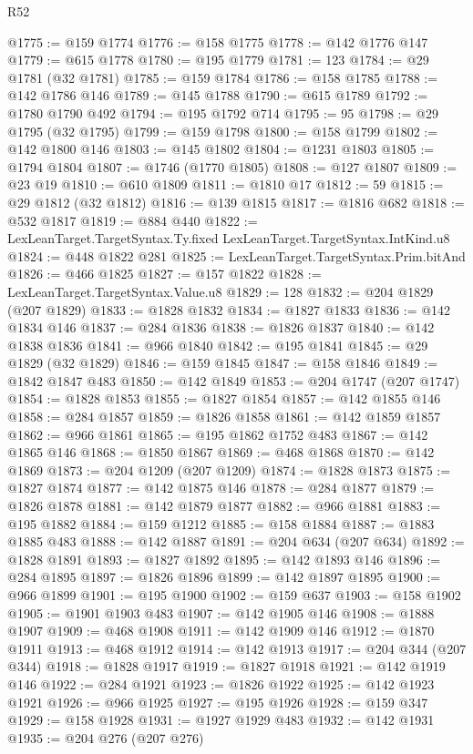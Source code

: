 \begin{lexlean}{R52}
\begin{coremodule}
{{{{{{{{{{{{{{{{{{{{{{{{{{{{{{{{{{{{{{{{{{{{{{{{{{{{{{{{{{{{{{{{{{{{{{{{{{{{{{{{{{{{{{{{{{{{{{{{{{{{{{{{{{{{{{{{{{{{{{{{{{{{{{{{{{{{{{{{{{{{{{{{{{{{{{{{{{{{{{{{{{{{{{{{{{{{{{{{{{{{{{{{{{{{{{{{{{{{{{@1775 := @159 @1774
@1776 := @158 @1775
@1778 := @142 @1776 @147
@1779 := @615 @1778
@1780 := @195 @1779
@1781 := 123
@1784 := @29 @1781 (@32 @1781)
@1785 := @159 @1784
@1786 := @158 @1785
@1788 := @142 @1786 @146
@1789 := @145 @1788
@1790 := @615 @1789
@1792 := @1780 @1790 @492
@1794 := @195 @1792 @714
@1795 := 95
@1798 := @29 @1795 (@32 @1795)
@1799 := @159 @1798
@1800 := @158 @1799
@1802 := @142 @1800 @146
@1803 := @145 @1802
@1804 := @1231 @1803
@1805 := @1794 @1804
@1807 := @1746 (@1770 @1805)
@1808 := @127 @1807
@1809 := @23 @19
@1810 := @610 @1809
@1811 := @1810 @17
@1812 := 59
@1815 := @29 @1812 (@32 @1812)
@1816 := @139 @1815
@1817 := @1816 @682
@1818 := @532 @1817
@1819 := @884 @440
@1822 := LexLeanTarget.TargetSyntax.Ty.fixed LexLeanTarget.TargetSyntax.IntKind.u8
@1824 := @448 @1822 @281
@1825 := LexLeanTarget.TargetSyntax.Prim.bitAnd
@1826 := @466 @1825
@1827 := @157 @1822
@1828 := LexLeanTarget.TargetSyntax.Value.u8
@1829 := 128
@1832 := @204 @1829 (@207 @1829)
@1833 := @1828 @1832
@1834 := @1827 @1833
@1836 := @142 @1834 @146
@1837 := @284 @1836
@1838 := @1826 @1837
@1840 := @142 @1838 @1836
@1841 := @966 @1840
@1842 := @195 @1841
@1845 := @29 @1829 (@32 @1829)
@1846 := @159 @1845
@1847 := @158 @1846
@1849 := @1842 @1847 @483
@1850 := @142 @1849
@1853 := @204 @1747 (@207 @1747)
@1854 := @1828 @1853
@1855 := @1827 @1854
@1857 := @142 @1855 @146
@1858 := @284 @1857
@1859 := @1826 @1858
@1861 := @142 @1859 @1857
@1862 := @966 @1861
@1865 := @195 @1862 @1752 @483
@1867 := @142 @1865 @146
@1868 := @1850 @1867
@1869 := @468 @1868
@1870 := @142 @1869
@1873 := @204 @1209 (@207 @1209)
@1874 := @1828 @1873
@1875 := @1827 @1874
@1877 := @142 @1875 @146
@1878 := @284 @1877
@1879 := @1826 @1878
@1881 := @142 @1879 @1877
@1882 := @966 @1881
@1883 := @195 @1882
@1884 := @159 @1212
@1885 := @158 @1884
@1887 := @1883 @1885 @483
@1888 := @142 @1887
@1891 := @204 @634 (@207 @634)
@1892 := @1828 @1891
@1893 := @1827 @1892
@1895 := @142 @1893 @146
@1896 := @284 @1895
@1897 := @1826 @1896
@1899 := @142 @1897 @1895
@1900 := @966 @1899
@1901 := @195 @1900
@1902 := @159 @637
@1903 := @158 @1902
@1905 := @1901 @1903 @483
@1907 := @142 @1905 @146
@1908 := @1888 @1907
@1909 := @468 @1908
@1911 := @142 @1909 @146
@1912 := @1870 @1911
@1913 := @468 @1912
@1914 := @142 @1913
@1917 := @204 @344 (@207 @344)
@1918 := @1828 @1917
@1919 := @1827 @1918
@1921 := @142 @1919 @146
@1922 := @284 @1921
@1923 := @1826 @1922
@1925 := @142 @1923 @1921
@1926 := @966 @1925
@1927 := @195 @1926
@1928 := @159 @347
@1929 := @158 @1928
@1931 := @1927 @1929 @483
@1932 := @142 @1931
@1935 := @204 @276 (@207 @276)
}}}}}}}}}}}}}}}}}}}}}}}}}}}}}}}}}}}}}}}}}}}}}}}}}}}}}}}}}}}}}}}}}}}}}}}}}}}}}}}}}}}}}}}}}}}}}}}}}}}}}}}}}}}}}}}}}}}}}}}}}}}}}}}}}}}}}}}}}}}}}}}}}}}}}}}}}}}}}}}}}}}}}}}}}}}}}}}}}}}}}}}}}}}}}}}}}}}}}}
\end{coremodule}
\end{lexlean}
